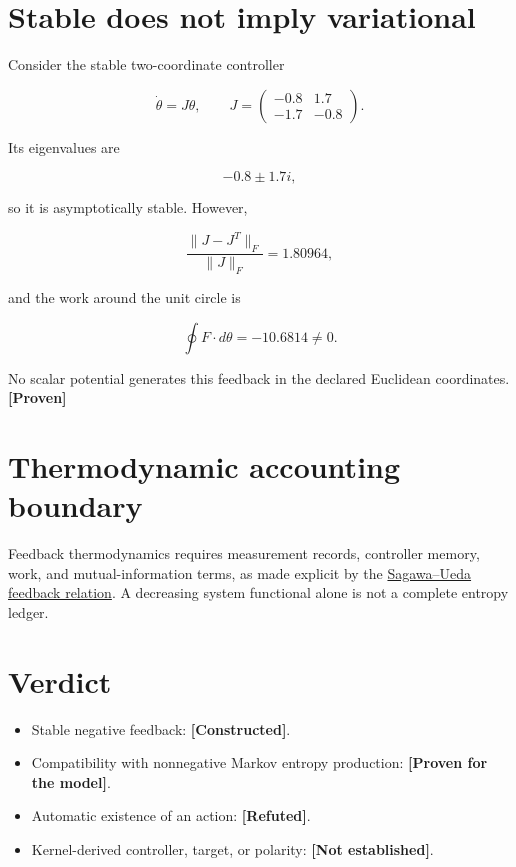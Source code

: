 \documentclass[11pt,a4paper,openany]{report}
\newcommand{\statusProven}{\textcolor{fingreen}{[Proven]}}
\newcommand{\statusRefuted}{\textcolor{finred}{[Refuted]}}
\begin{document}
\section{Stable does not imply variational}

Consider the stable two-coordinate controller

\[
\dot\theta=J\theta,
\qquad
J=
\begin{pmatrix}
-0.8&1.7\\
-1.7&-0.8
\end{pmatrix}.
\]

Its eigenvalues are

\[
-0.8\pm1.7i,
\]

so it is asymptotically stable. However,

\[
\frac{\|J-J^T\|_F}{\|J\|_F}=1.80964,
\]

and the work around the unit circle is

\[
\oint F\cdot d\theta=-10.6814\ne0.
\]

No scalar potential generates this feedback in the declared Euclidean coordinates. \textbf{\statusProven{}}

\section{Thermodynamic accounting boundary}

Feedback thermodynamics requires measurement records, controller memory, work, and mutual-information terms, as made explicit by the \href{https://doi.org/10.1103/PhysRevLett.104.090602}{Sagawa–Ueda feedback relation}. A decreasing system functional alone is not a complete entropy ledger.

\section{Verdict}

\begin{itemize}
\item 
Stable negative feedback: \textbf{[Constructed]}.

\item 
Compatibility with nonnegative Markov entropy production: \textbf{[Proven for the model]}.

\item 
Automatic existence of an action: \textbf{\statusRefuted{}}.

\item 
Kernel-derived controller, target, or polarity: \textbf{[Not established]}.

\end{itemize}
\end{document}
